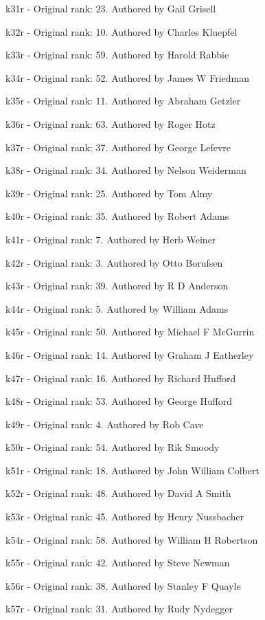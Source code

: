 \item k31r - Original rank: 23. Authored by Gail Grisell
\item k32r - Original rank: 10. Authored by Charles Kluepfel
\item k33r - Original rank: 59. Authored by Harold Rabbie
\item k34r - Original rank: 52. Authored by James W Friedman
\item k35r - Original rank: 11. Authored by Abraham Getzler
\item k36r - Original rank: 63. Authored by Roger Hotz
\item k37r - Original rank: 37. Authored by George Lefevre
\item k38r - Original rank: 34. Authored by Nelson Weiderman
\item k39r - Original rank: 25. Authored by Tom Almy
\item k40r - Original rank: 35. Authored by Robert Adams
\item k41r - Original rank: 7. Authored by Herb Weiner
\item k42r - Original rank: 3. Authored by Otto Borufsen
\item k43r - Original rank: 39. Authored by R D Anderson
\item k44r - Original rank: 5. Authored by William Adams
\item k45r - Original rank: 50. Authored by Michael F McGurrin
\item k46r - Original rank: 14. Authored by Graham J Eatherley
\item k47r - Original rank: 16. Authored by Richard Hufford
\item k48r - Original rank: 53. Authored by George Hufford
\item k49r - Original rank: 4. Authored by Rob Cave
\item k50r - Original rank: 54. Authored by Rik Smoody
\item k51r - Original rank: 18. Authored by John William Colbert
\item k52r - Original rank: 48. Authored by David A Smith
\item k53r - Original rank: 45. Authored by Henry Nussbacher
\item k54r - Original rank: 58. Authored by William H Robertson
\item k55r - Original rank: 42. Authored by Steve Newman
\item k56r - Original rank: 38. Authored by Stanley F Quayle
\item k57r - Original rank: 31. Authored by Rudy Nydegger
